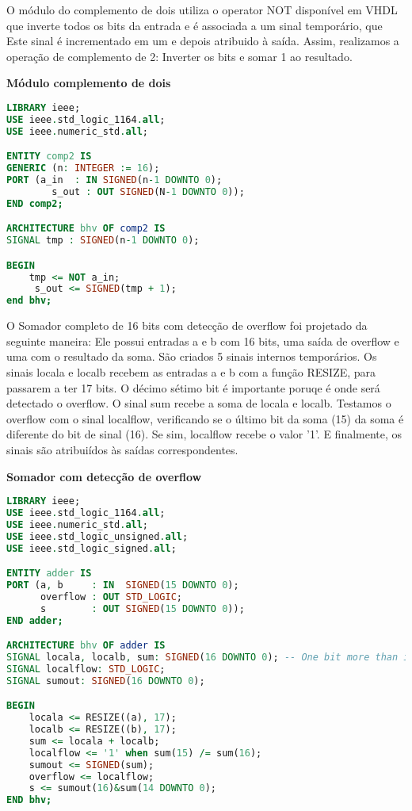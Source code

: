 \documentclass[a4paper]{article}
\begin{document}
O módulo do complemento de dois utiliza o operator NOT disponível em VHDL que inverte todos os bits da entrada e é associada a um sinal temporário, que Este sinal é incrementado em um e depois atribuido à saída. Assim, realizamos a operação de complemento de 2: Inverter os bits e somar 1 ao resultado.
\bigskip

\textbf{Módulo complemento de dois}
\begin{lstlisting}[language=VHDL]
LIBRARY ieee;
USE ieee.std_logic_1164.all;
USE ieee.numeric_std.all;

ENTITY comp2 IS
GENERIC (n: INTEGER := 16);
PORT (a_in  : IN SIGNED(n-1 DOWNTO 0);
		s_out : OUT SIGNED(N-1 DOWNTO 0));
END comp2;

ARCHITECTURE bhv OF comp2 IS
SIGNAL tmp : SIGNED(n-1 DOWNTO 0);

BEGIN
    tmp <= NOT a_in;
	 s_out <= SIGNED(tmp + 1);
end bhv;
\end{lstlisting}
\smallskip

O Somador completo de 16 bits com detecção de overflow foi projetado da seguinte maneira:
Ele possui entradas a e b com 16 bits, uma saída de overflow e uma com o resultado da soma. São criados 5 sinais internos temporários. Os sinais locala e localb recebem as entradas a e b com a função RESIZE, para passarem a ter 17 bits. O décimo sétimo bit é importante poruqe é onde será detectado o overflow. O sinal sum recebe a soma de locala e localb. Testamos o overflow com o sinal localflow, verificando se o último bit da soma (15) da soma é diferente do bit de sinal (16). Se sim, localflow recebe o valor '1'. E finalmente, os sinais são atribuiídos às saídas correspondentes.
\bigskip

\textbf{Somador com detecção de overflow}
\begin{lstlisting}[language=VHDL]
LIBRARY ieee;
USE ieee.std_logic_1164.all;
USE ieee.numeric_std.all;
USE ieee.std_logic_unsigned.all;
USE ieee.std_logic_signed.all;

ENTITY adder IS
PORT (a, b     : IN  SIGNED(15 DOWNTO 0);
      overflow : OUT STD_LOGIC;
	  s        : OUT SIGNED(15 DOWNTO 0));
END adder;

ARCHITECTURE bhv OF adder IS
SIGNAL locala, localb, sum: SIGNED(16 DOWNTO 0); -- One bit more than input
SIGNAL localflow: STD_LOGIC;
SIGNAL sumout: SIGNED(16 DOWNTO 0);

BEGIN
	locala <= RESIZE((a), 17);
	localb <= RESIZE((b), 17);
	sum <= locala + localb;
	localflow <= '1' when sum(15) /= sum(16);
	sumout <= SIGNED(sum);
	overflow <= localflow;
	s <= sumout(16)&sum(14 DOWNTO 0);
END bhv;
\end{lstlisting}
\smallskip
\end{document}
